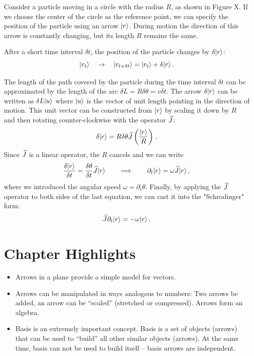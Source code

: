 Consider a  particle moving in a circle with the radius $R$, as shown in Figure X. If we choose the center of the circle as the reference point, we can specify the position of the particle using an arrow $|{r}\rangle$. During motion the direction of this arrow is constantly changing, but its length $R$ remains the same.  

After a short time interval $\delta t$, the position of the particle changes by $\delta|{r}\rangle$:
\[
|{r_t}\rangle\quad\rightarrow\quad |{r_{t+\delta t}}\rangle = |{r_t}\rangle+\delta|{r}\rangle\,.
\]

The length of the path covered by the particle during the time interval $\delta t$ can be approximated by the length of the arc  $\delta L=R\delta\theta=v\delta t$. The arrow $\delta|{r}\rangle$ can be written as $\delta L|{u}\rangle$ where $|{u}\rangle$ is the vector of unit length pointing in the direction of motion. This unit vector can be constructed from $|{r}\rangle$ by scaling it down by $R$ and then rotating counter-clockwise with the operator $\widehat{J}$: 
\[
\delta|{r}\rangle=R\delta\theta\widehat{J}\left(\frac{|{r}\rangle}{R}\right)\,.
\]
Since $\widehat{J}$ is a linear operator, the $R$ cancels and we can write
\[
\frac{\delta|{r}\rangle}{\delta t}=\frac{\delta\theta}{\delta t}\widehat{J}|{r}\rangle\qquad\Longrightarrow\qquad
\partial_t|{r}\rangle=\omega\widehat{J}|{r}\rangle\,,
\]
where we introduced the angular speed $\omega=\partial_t\theta$. Finally, by applying the $\widehat{J}$ operator to both sides of the last equation, we can cast it into the "Schrodinger" form:
\[
\widehat{J}\partial_t|{r}\rangle=-\omega|{r}\rangle\,.
\]  



\section*{Chapter Highlights}
{\chhc
  \it
\begin{itemize}
\item Arrows in a plane provide a simple model for vectors.
\item Arrows can be manipulated in ways analogous to numbers: Two arrows
  be added, an arrow can be ``scaled'' (stretched or compressed). Arrows form
  an algebra.
\item Basis is an extremely important concept. Basis is a set of
  objects (arrows) that can be used to ``build'' all other similar
  objects (arrows). At the same time, basis can not be used to build
  itself -- basis arrows are independent.
\end{itemize}
}
